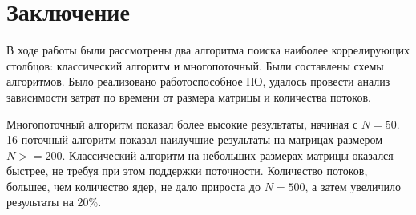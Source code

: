 \chapter{Заключение}
В ходе работы были рассмотрены два алгоритма поиска наиболее коррелирующих столбцов: классический алгоритм
и многопоточный.
Были составлены схемы алгоритмов.
Было реализовано работоспособное ПО, удалось провести анализ зависимости затрат по времени от размера матрицы и количества потоков.

Многопоточный алгоритм показал более высокие результаты, начиная с $N=50$.
16-поточный алгоритм показал наилучшие результаты на матрицах размером $N >= 200$. 
Классический алгоритм на небольших размерах матрицы оказался быстрее, не требуя при этом
поддержки поточности.
Количество потоков, большее, чем количество ядер, не дало прироста до $N = 500$, а затем
увеличило результаты на 20\%.
